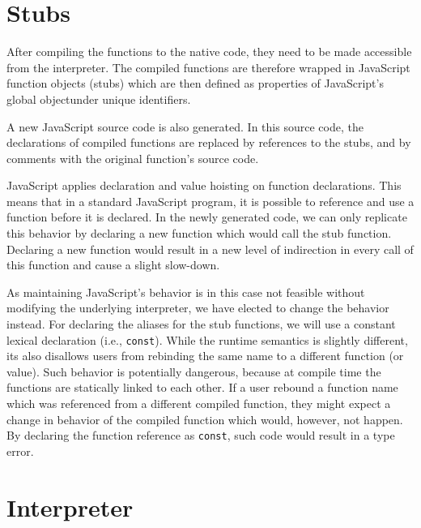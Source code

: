 \section{Stubs}

After compiling the functions to the native code, they need to be made accessible from the interpreter. The compiled functions are therefore wrapped in JavaScript function objects (stubs) which are then defined as properties of JavaScript's global object\footnotemark[1] under unique identifiers.


A new JavaScript source code is also generated. In this source code, the declarations of compiled functions are replaced by references to the stubs, and by comments with the original function's source code.

JavaScript applies declaration and value hoisting on function declarations. This means that in a standard JavaScript program, it is possible to reference and use a function before it is declared. In the newly generated code, we can only replicate this behavior by declaring a new function which would call the stub function. Declaring a new function would result in a new level of indirection in every call of this function and cause a slight slow-down.

As maintaining JavaScript's behavior is in this case not feasible without modifying the underlying interpreter, we have elected to change the behavior instead. For declaring the aliases for the stub functions, we will use a constant lexical declaration (i.e., \texttt{const}). While the runtime semantics is slightly different, its also disallows users from rebinding the same name to a different function (or value). Such behavior is potentially dangerous, because at compile time the functions are statically linked to each other. If a user rebound a function name which was referenced from a different compiled function, they might expect a change in behavior of the compiled function which would, however, not happen. By declaring the function reference as \texttt{const}, such code would result in a type error.


\section{Interpreter}

